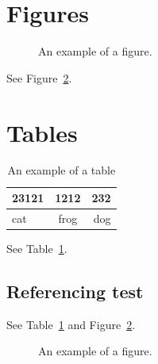 \documentclass[a4paper,11pt,phdthesis,singlespace,twoside]{cssethesis}
\begin{document}
\section{Figures}
\begin{figure}[H]
\begin{center}
\end{center}
\caption{An example of a figure.}
\label{fig:example}
\end{figure}
See Figure~\ref{fig:example}.

\section{Tables}
\begin{table}
\begin{center}
\begin{tabular}{lcr}
23121 & 1212 & 232 \\ \hline  
cat & frog & dog
\end{tabular}
\end{center}
\caption{An example of a table}
\label{tab:example}
\end{table}
See Table~\ref{tab:example}.

\subsection{Referencing test}
See Table~\ref{tab:example} and Figure~\ref{fig:example}.


\begin{figure}[ht]
\begin{center}
\end{center}
\caption{An example of a figure.}
\label{fig:example}
\end{figure}
\end{document}
